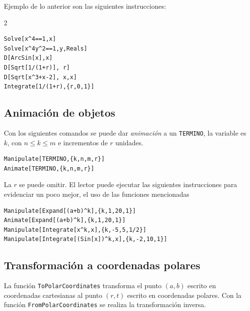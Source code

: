     Ejemplo de lo anterior son las siguientes instrucciones:
    \begin{tcolorbox}
      \begin{multicols}{2}
\begin{Verbatim}[formatcom=\letraverbatim]
Solve[x^4==1,x]
Solve[x^4y^2==1,y,Reals]
D[ArcSin[x],x]
D[Sqrt[1/(1+r)], r]
D[Sqrt[x^3+x-2], x,x]
Integrate[1/(1+r),{r,0,1}]
\end{Verbatim}
      \end{multicols}
    \end{tcolorbox}

    \subsection{Animación de objetos}
    Con los siguientes comandos se puede dar \emph{animación} a un \verb"TERMINO", la variable es $k$, con $n \leq k \leq m $
    e incrementos de $r$ unidades.
    \begin{tcolorbox}[title=Las funciones {\tt Manipulate} y {\tt Animate} ]

\begin{Verbatim}
Manipulate[TERMINO,{k,n,m,r}]
Animate[TERMINO,{k,n,m,r}]
\end{Verbatim}

    \end{tcolorbox}
    La $r$ se puede omitir. %
    El lector puede ejecutar las siguientes instrucciones
    para evidenciar un poco mejor, el uso de las funciones mencionadas
    \begin{tcolorbox}[title=Ejemplos con {\tt Manipulate} y {\tt Animate}]
\begin{Verbatim}
Manipulate[Expand[(a+b)^k],{k,1,20,1}]
Animate[Expand[(a+b)^k],{k,1,20,1}]
Manipulate[Integrate[x^k,x],{k,-5,5,1/2}]
Manipulate[Integrate[(Sin[x])^k,x],{k,-2,10,1}]
\end{Verbatim}
    \end{tcolorbox}

    \subsection{Transformación a coordenadas polares}
    La función \verb"ToPolarCoordinates" transforma el punto $(a,b)$ escrito en coordenadas cartesianas
    al punto $(r, t)$ escrito en coordenadas polares.
    Con la función \verb"FromPolarCoordinates" se realiza la transformación inversa.
      

